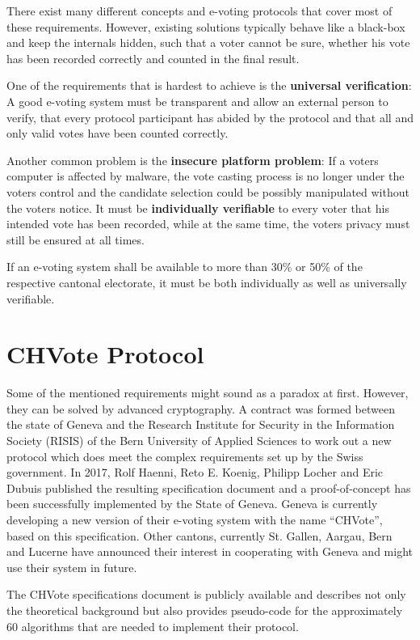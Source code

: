 There exist many different concepts and e-voting protocols that cover most of these requirements. However, existing solutions typically behave like a black-box and keep the internals hidden, such that a voter cannot be sure, whether his vote has been recorded correctly and counted in the final result.

One of the requirements that is hardest to achieve is the \textbf{universal verification}: A good e-voting system must be transparent and allow an external person to verify, that every protocol participant has abided by the protocol and that all and only valid votes have been counted correctly.

Another common problem is the \textbf{insecure platform problem}: If a voters computer is affected by malware, the vote casting process is no longer under the voters control and the candidate selection could be possibly manipulated without the voters notice. It must be \textbf{individually verifiable} to every voter that his intended vote has been recorded, while at the same time, the voters privacy must still be ensured at all times.

If an e-voting system shall be available to more than 30\% or 50\% of the respective cantonal electorate, it must be both individually as well as universally verifiable.

\section{CHVote Protocol}
Some of the mentioned requirements might sound as a paradox at first. However, they can be solved by advanced cryptography. A contract was formed between the state of Geneva and the  Research Institute for Security in the Information Society (RISIS) of the Bern University of Applied Sciences to work out a new protocol which does meet the complex requirements set up by the Swiss government. In 2017, Rolf Haenni, Reto E. Koenig, Philipp Locher and Eric Dubuis published the resulting specification document and a proof-of-concept has been successfully implemented by the State of Geneva. Geneva is currently developing a new version of their e-voting system with the name "`CHVote"', based on this specification. Other cantons, currently St. Gallen, Aargau, Bern and Lucerne have announced their interest in cooperating with Geneva and might use their system in future.

The CHVote specifications document is publicly available and describes not only the theoretical background but also provides pseudo-code for the approximately 60 algorithms that are needed to implement their protocol.

